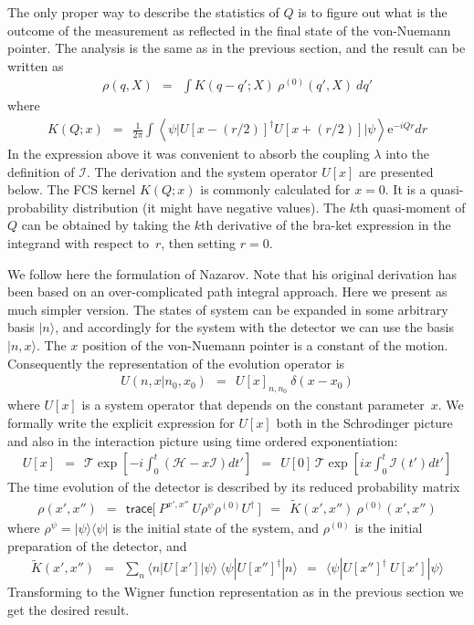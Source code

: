 \documentclass[onecolumn,fleqn, 11pt]{revtex4}
\newcommand{\trc}{\mathsf{trace}}
\newcommand{\eexp}{\mathrm{e}^}
\newcommand{\beq}{\begin{eqnarray}}
\newcommand{\eeq}{\end{eqnarray}}
\begin{document}
The only proper way to describe the statistics of $Q$ 
is to figure out what is the outcome of the measurement 
as reflected in the final state of the von-Nuemann pointer.
The analysis is the same as in the previous section, 
and the result can be written as 
\beq
\rho(q,X) \ \ = \ \  \int K(q{-}q';X) \ \rho^{(0)}(q',X) \ dq' 
\eeq
where  
\beq
K(Q;x) \ \ = \ \ \frac{1}{2\pi} \int 
\left\langle \psi \Big| U[x-(r/2)]^{\dag} U[x+(r/2)] \Big| \psi \right\rangle \eexp{-iQr} dr
\eeq
In the expression above it was convenient 
to absorb the coupling $\lambda$ into the definition 
of $\mathcal{I}$. The derivation and the 
system operator $U[x]$ are presented below.   
The FCS kernel $K(Q;x)$ is commonly calculated for $x=0$. 
It is a quasi-probability distribution (it might have negative values).  
The $k$th quasi-moment of $Q$ can be obtained by taking the $k$th 
derivative of the bra-ket expression in the integrand 
with respect to~$r$, then setting $r=0$. 
 

We follow here the formulation of Nazarov. 
Note that his original derivation has been based on 
an over-complicated path integral approach.
Here we present as much simpler version. 
The states of system can be expanded in some arbitrary basis $|n\rangle$,  
and accordingly for the system with the detector 
we can use the basis ${|n,x\rangle}$. 
The $x$ position of the von-Nuemann pointer is 
a constant of the motion. Consequently the representation 
of the evolution operator is  
\beq
U(n,x|n_0,x_0) \ \ = \ \ U[x]_{n,n_0} \ \delta(x-x_0)
\eeq
where $U[x]$ is a system operator that depends 
on the constant parameter~$x$.    
We formally write the explicit expression for $U[x]$ both in the Schrodinger picture
and also in the interaction picture using time ordered exponentiation:  
\beq
U[x] 
\ \ = \ \ \mathcal{T}\exp\left[-i\int_0^t (\mathcal{H} - x\mathcal{I})dt' \right]   
\ \ = \ \ U[0] \,\mathcal{T}\exp\left[i x \int_0^t \mathcal{I}(t')dt' \right]  
\eeq
The time evolution of the detector is described by its 
reduced probability matrix 
\beq
\rho(x',x'') 
\ \ = \ \ \trc\Big[ \ P^{x',x''} \  U \rho^{\psi} \rho^{(0)} U^{\dag} \  \Big]
\ \ = \ \ \tilde{K}(x',x'') \ \rho^{(0)}(x',x'') 
\eeq
where ${\rho^{\psi} = |\psi\rangle\langle\psi|}$ is the 
initial state of the system, and ${\rho^{(0)}}$ 
is the initial preparation of the detector, and 
\beq
\tilde{K}(x',x'') 
\ \ = \ \ \sum_n \langle n | U[x'] | \psi \rangle \ \langle \psi | U[x'']^{\dag} | n \rangle
\ \ = \ \ \langle \psi | U[x'']^{\dag} \ U[x'] | \psi \rangle
\eeq
Transforming to the Wigner function representation as in the previous section 
we get the desired result.
\end{document}
